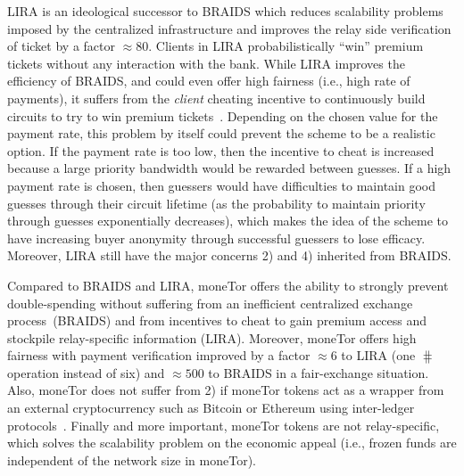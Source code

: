 LIRA is an ideological successor
to BRAIDS which reduces scalability problems imposed by the centralized
infrastructure and improves the relay side verification of ticket by a factor $\approx 80$. Clients in LIRA probabilistically ``win'' premium tickets
without any interaction with the bank. While LIRA improves the efficiency of
BRAIDS, and could even offer high fairness (i.e., high rate of payments), it suffers 
from the \textit{client} cheating incentive to continuously build circuits to try to 
win premium tickets~\cite{jansen2013lira, jansenblogpost}. Depending on the chosen 
value for the payment rate, this problem by itself could prevent the scheme to be a 
realistic option. If the payment rate 
is too low, then the incentive to cheat is increased because a large priority bandwidth would be rewarded between guesses. If a high payment rate is 
chosen, then guessers would have difficulties to maintain good guesses through their 
circuit lifetime (as the probability to maintain priority through guesses exponentially decreases), which makes the idea of the scheme to have increasing buyer anonymity through successful guessers to lose efficacy. Moreover, LIRA still have the major concerns 2) and 4) inherited from BRAIDS.

Compared to BRAIDS and LIRA, moneTor offers the ability to strongly prevent double-spending without suffering from an inefficient centralized exchange process~\cite{jansenblogpost}(BRAIDS) and from incentives to cheat to gain premium access and stockpile relay-specific information (LIRA). Moreover, moneTor offers high fairness with payment verification improved by a factor $\approx 6$ to LIRA (one $\hash$ operation instead of six) and $\approx 500$ to BRAIDS in a fair-exchange situation. Also, moneTor does not suffer from 2) if moneTor tokens act as a wrapper from an external cryptocurrency such as Bitcoin or Ethereum using inter-ledger protocols~\cite{back2014enabling, poon2017plasma}. Finally and more important, moneTor tokens are not relay-specific, which solves the scalability problem on the economic appeal (i.e., frozen funds are independent of the network size in moneTor).

